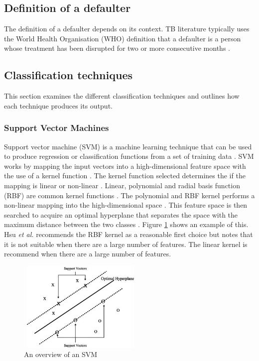 \documentclass{sig-alternate-05-2015}
\begin{document}
	\subsection{Definition of a defaulter}
	The definition of a defaulter depends on its context. TB literature typically uses the World Health Organisation (WHO) definition that a defaulter is a person whose treatment has been disrupted for two or more consecutive months \cite{chan:2003prevalence, cherkaoui:19326203, Jha:10.1371/journal.pone.0008873,jittimanee:10.1111/j.1440-172X.2007.00650.x,muture:6660173120110101, world2015TB}.
	
	\subsection{Classification techniques}
	This section examines the different classification techniques and outlines how each technique produces its output.
	\subsubsection{Support Vector Machines}
	Support vector machine (SVM) is a machine learning technique that can be used to produce regression or classification functions from a set of training data \cite{Luo20097562}. SVM works by mapping the input vectors into a high-dimensional feature space with the use of a kernel function \cite{Danenas20153194}. The kernel function selected determines the if the mapping is linear or non-linear \cite{Luo20097562}. Linear, polynomial and radial basis function (RBF) are common kernel functions \cite{hsu2003practical}. The polynomial and RBF kernel performs a non-linear mapping into the high-dimensional space \cite{hsu2003practical}. This feature space is then searched to acquire an optimal hyperplane that separates the space with the maximum distance between the two classes \cite{Danenas20153194}. Figure \ref{fig:svm-overview} shows an example of this. Hsu \textit{et al.} \cite{hsu2003practical} recommends the RBF kernel as a reasonable first choice but notes that it is not suitable when there are a large number of features. The linear kernel is recommend when there are a large number of features.
	
	\begin{figure}
		\centering
		\includegraphics[height=4.34cm, width=6cm]{SVM}
		\caption{An overview  of an SVM \cite{Li2006772}}
		\label{fig:svm-overview}
	\end{figure}
	
\end{document}
